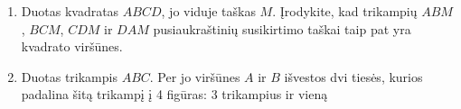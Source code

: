 \begin{enumerate}
\item Duotas kvadratas $ABCD$, jo viduje taškas $M$.  Įrodykite, kad
  trikampių $ABM$, $BCM$, $CDM$ ir $DAM$ pusiaukraštinių susikirtimo taškai
  taip pat yra kvadrato viršūnes.
\item Duotas trikampis $ABC$. Per jo viršūnes $A$ ir $B$ išvestos dvi
  tiesės, kurios padalina šitą trikampį į 4 figūras: 3 trikampius ir vieną

\end{enumerate}
